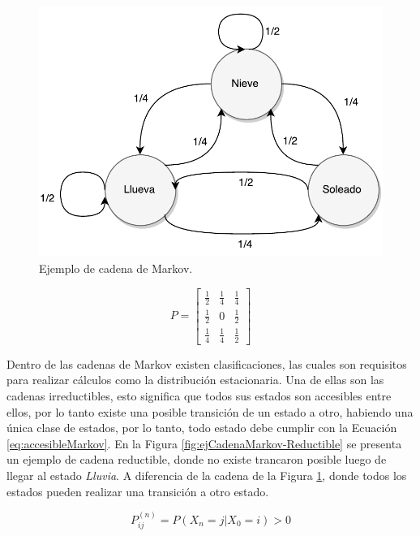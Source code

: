 \begin{figure}[ht!]
	\centering
	\includegraphics[scale=0.5]{images/EjCadenaMarkov.pdf}
	\caption{Ejemplo de cadena de Markov.}
	\label{fig:ejCadenaMarkov}
\end{figure}

\begin{equation} \label{eq:ejCadenaMarkov}
	P =
	\begin{bmatrix}
		\frac{1}{2} & \frac{1}{4} & \frac{1}{4} \\
		\frac{1}{2} & 0 & \frac{1}{2} \\
		\frac{1}{4} & \frac{1}{4} & \frac{1}{2}
	\end{bmatrix}	
\end{equation}

\normalsize{Dentro de las cadenas de Markov existen clasificaciones, las cuales son requisitos para realizar cálculos como la distribución estacionaria. Una de ellas son las cadenas irreductibles, esto significa que todos sus estados son accesibles entre ellos, por lo tanto existe una posible transición de un estado a otro, habiendo una única clase de estados, por lo tanto, todo estado debe cumplir con la Ecuación} \ref{eq:accesibleMarkov}. \normalsize{En la Figura} \ref{fig:ejCadenaMarkov-Reductible} \normalsize{se presenta un ejemplo de cadena reductible, donde no existe trancaron posible luego de llegar al estado \textit{Lluvia}. A diferencia de la cadena de la Figura} \ref{fig:ejCadenaMarkov}, \normalsize{donde todos los estados pueden realizar una transición a otro estado.}

\begin{equation} \label{eq:accesibleMarkov}
	P_{ij}^{(n)} = P(X_n = j | X_0 = i) > 0
\end{equation}

